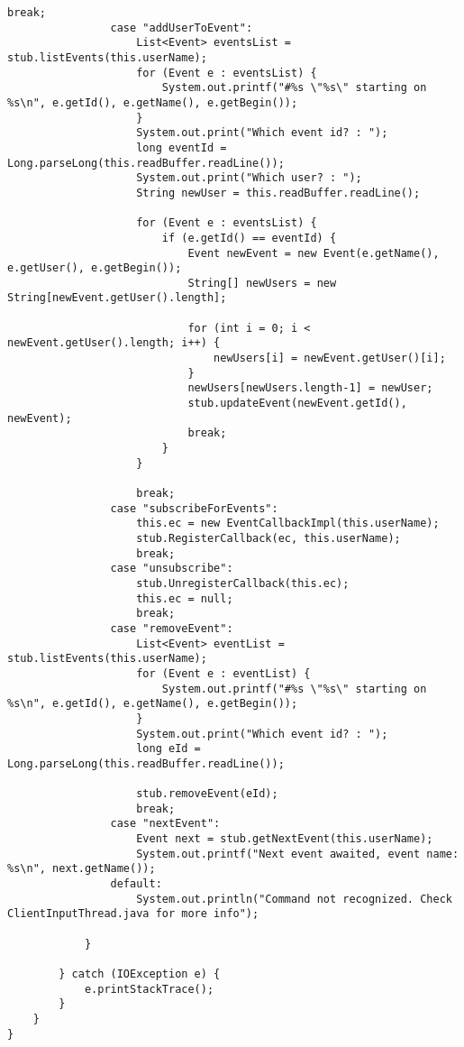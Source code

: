 \begin{lstlisting}[style=java]
                    break;
                case "addUserToEvent":
                    List<Event> eventsList = stub.listEvents(this.userName);
                    for (Event e : eventsList) {
                        System.out.printf("#%s \"%s\" starting on %s\n", e.getId(), e.getName(), e.getBegin());
                    }
                    System.out.print("Which event id? : ");
                    long eventId = Long.parseLong(this.readBuffer.readLine());
                    System.out.print("Which user? : ");
                    String newUser = this.readBuffer.readLine();

                    for (Event e : eventsList) {
                        if (e.getId() == eventId) {
                            Event newEvent = new Event(e.getName(), e.getUser(), e.getBegin());
                            String[] newUsers = new String[newEvent.getUser().length];

                            for (int i = 0; i < newEvent.getUser().length; i++) {
                                newUsers[i] = newEvent.getUser()[i];
                            }
                            newUsers[newUsers.length-1] = newUser;
                            stub.updateEvent(newEvent.getId(), newEvent);
                            break;
                        }
                    }

                    break;
                case "subscribeForEvents":
                    this.ec = new EventCallbackImpl(this.userName);
                    stub.RegisterCallback(ec, this.userName);
                    break;
                case "unsubscribe":
                    stub.UnregisterCallback(this.ec);
                    this.ec = null;
                    break;
                case "removeEvent":
                    List<Event> eventList = stub.listEvents(this.userName);
                    for (Event e : eventList) {
                        System.out.printf("#%s \"%s\" starting on %s\n", e.getId(), e.getName(), e.getBegin());
                    }
                    System.out.print("Which event id? : ");
                    long eId = Long.parseLong(this.readBuffer.readLine());

                    stub.removeEvent(eId);
                    break;
                case "nextEvent":
                    Event next = stub.getNextEvent(this.userName);
                    System.out.printf("Next event awaited, event name: %s\n", next.getName());
                default:
                    System.out.println("Command not recognized. Check ClientInputThread.java for more info");

            }

        } catch (IOException e) {
            e.printStackTrace();
        }
    }
}

\end{lstlisting}

